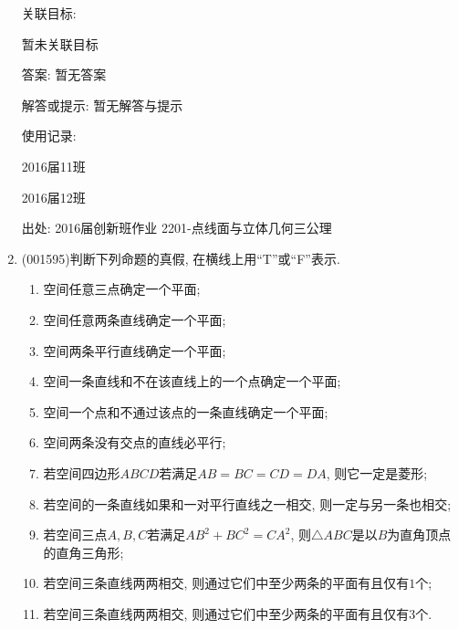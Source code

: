 \documentclass[10pt,a4paper]{article}
\newcommand{\blank}[1]{\underline{\hbox to #1pt{}}}
\begin{document}
\begin{enumerate}[1.]
关联目标:

暂未关联目标

答案: 暂无答案

解答或提示: 暂无解答与提示

使用记录:

2016届11班				

2016届12班				


出处: 2016届创新班作业	2201-点线面与立体几何三公理
\item { (001595)}判断下列命题的真假, 在横线上用``T''或``F''表示.
\begin{enumerate}[\blank{30}(1)]
\item 空间任意三点确定一个平面;\\ 
\item 空间任意两条直线确定一个平面;\\ 
\item 空间两条平行直线确定一个平面;\\ 
\item 空间一条直线和不在该直线上的一个点确定一个平面;\\ 
\item 空间一个点和不通过该点的一条直线确定一个平面;\\ 
\item 空间两条没有交点的直线必平行;\\ 
\item 若空间四边形$ABCD$若满足$AB=BC=CD=DA$, 则它一定是菱形;\\ 
\item 若空间的一条直线如果和一对平行直线之一相交, 则一定与另一条也相交;\\ 
\item 若空间三点$A,B,C$若满足$AB^2+BC^2=CA^2$, 则$\triangle ABC$是以$B$为直角顶点的直角三角形;\\ 
\item 若空间三条直线两两相交, 则通过它们中至少两条的平面有且仅有$1$个;\\ 
\item 若空间三条直线两两相交, 则通过它们中至少两条的平面有且仅有$3$个.\\ 
\end{enumerate}



\end{enumerate}
\end{document}
